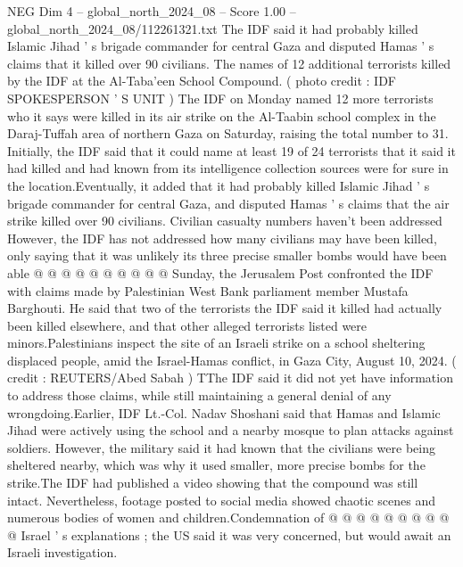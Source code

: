 \begin{textsample}{NEG Dim 4 – global\_north\_2024\_08 – Score 1.00 – global\_north\_2024\_08/112261321.txt}  \label{ex:f4_neg_309}
The IDF said it had probably killed Islamic Jihad ' s brigade commander for central Gaza and disputed Hamas ' s claims that it killed over 90 civilians.
The names of 12 additional terrorists killed by the IDF at the Al-Taba'een School Compound. ( photo credit : IDF SPOKESPERSON ' S UNIT ) The IDF on Monday named 12 more terrorists who it says were killed in its air strike on the Al-Taabin school complex in the Daraj-Tuffah area of northern Gaza on Saturday, raising the total number to 31.
Initially, the IDF said that it could name at least 19 of 24 terrorists that it said it had killed and had known from its intelligence collection sources were for sure in the location.Eventually, it added that it had probably killed Islamic Jihad ' s brigade commander for central Gaza, and disputed Hamas ' s claims that the air strike killed over 90 civilians.
Civilian casualty numbers haven't been addressed However, the IDF has not addressed how many civilians may have been killed, only saying that it was unlikely its three precise smaller bombs would have been able @ @ @ @ @ @ @ @ @ @ Sunday, the Jerusalem Post confronted the IDF with claims made by Palestinian West Bank parliament member Mustafa Barghouti.
He said that two of the terrorists the IDF said it killed had actually been killed elsewhere, and that other alleged terrorists listed were minors.Palestinians inspect the site of an Israeli strike on a school sheltering displaced people, amid the Israel-Hamas conflict, in Gaza City, August 10, 2024. ( credit : REUTERS/Abed Sabah ) TThe IDF said it did not yet have information to address those claims, while still maintaining a general denial of any wrongdoing.Earlier, IDF Lt.-Col.
Nadav Shoshani said that Hamas and Islamic Jihad were actively using the school and a nearby mosque to plan attacks against soldiers.
However, the military said it had known that the civilians were being sheltered nearby, which was why it used smaller, more precise bombs for the strike.The IDF had published a video showing that the compound was still intact.
Nevertheless, footage posted to social media showed chaotic scenes and numerous bodies of women and children.Condemnation of @ @ @ @ @ @ @ @ @ @ Israel ' s explanations ; the US said it was very concerned, but would await an Israeli investigation.

\end{textsample}
